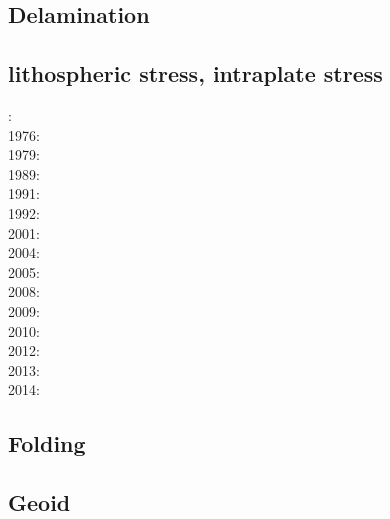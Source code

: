 \subsection*{Delamination}

\cite{gopy08}
\cite{vabv10}
\cite{vavg12}
\cite{baeg14}
\cite{bems17}

\subsection*{lithospheric stress, intraplate stress}

: \cite{fouy75}\\
1976: \cite{riso76}\\
1979: \cite{riso79}\\
1989: \cite{boww89}\\
1991: \cite{worg91}\\
1992: \cite{rich92}\cite{wuvr92}\cite{zoba92}\cite{clko92}\\
2001: \cite{stsm01}\\
2004: \cite{ligu04}\\
2005: \cite{timr05}\\
2008: \cite{bilr08}\cite{ghhw08}\\
2009: \cite{ghhf09}\cite{nacl09}\\
2010: \cite{bepo10}\\
2012: \cite{nalr12}\cite{ghho12}\\
2013: \cite{ghhw13}\\
2014: \cite{vagw14}


\subsection*{Folding}

\noindent
\cite{ramb68}
\cite{ramb70}
\cite{ramb71}
\cite{flet91}
\cite{flet95}
\cite{frsc06}
\cite{schm08}
\cite{resb10}
\cite{freh11}
\cite{reds12}\cite{grsc12}
\cite{regc13}
\cite{freh14}\cite{frex14}
\cite{frsc16}


\subsection*{Geoid}

